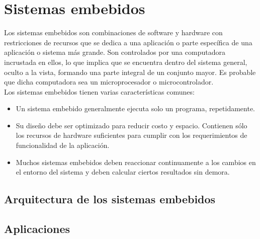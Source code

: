 \section{Sistemas embebidos}
	Los sistemas embebidos son combinaciones de software y hardware con restricciones de recursos que se dedica a una aplicación o parte específica de una aplicación o sistema más grande. Son controlados por una computadora incrustada en ellos, lo que implica que se encuentra dentro del sistema general, oculto a la vista, formando una parte integral de un conjunto mayor. Es probable que dicha computadora sea un microprocesador o microcontrolador.\\
	
	Los sistemas embebidos tienen varias características comunes:
	\begin{itemize}
		\item Un sistema embebido generalmente ejecuta solo un programa, repetidamente.
		\item Su diseño debe ser optimizado para reducir costo y espacio. Contienen sólo los recursos de hardware suficientes para cumplir con  los  requerimientos  de  funcionalidad  de  la  aplicación.
		\item Muchos sistemas embebidos deben reaccionar continuamente a los cambios en el entorno del sistema y deben calcular ciertos resultados sin demora.
	\end{itemize}
	\subsection{Arquitectura de los sistemas embebidos}
	\subsection{Aplicaciones}